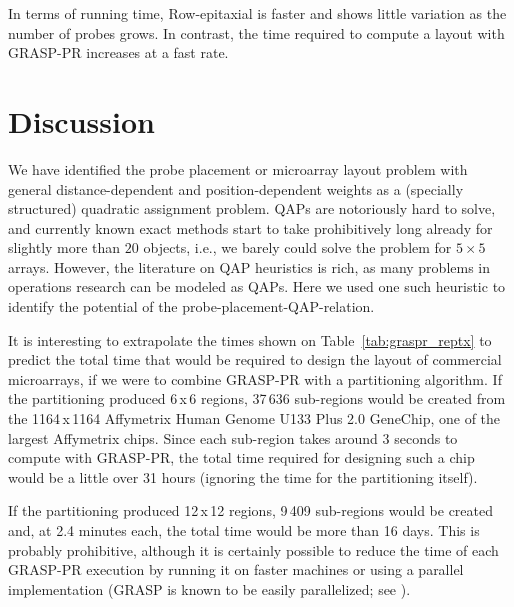 \documentclass[english]{lni}
\newcommand{\ignore}[1]{}
\begin{document}
In terms of running time, Row-epitaxial is faster and shows little variation
as the number of probes grows. In contrast, the time required to compute a
layout with GRASP-PR increases at a fast rate.

\section{Discussion}
\label{sec:discussion}

We have identified the probe placement or microarray layout problem with
general distance-dependent and position-dependent weights as a (specially
structured) quadratic assignment problem. QAPs are notoriously hard to solve,
and currently known exact methods start to take prohibitively long already for
slightly more than $20$ objects, i.e., we barely could solve the problem for
$5\times 5$ arrays. However, the literature on QAP heuristics is rich,
as many problems in operations research can be modeled as QAPs. Here we used
one such heuristic to identify the potential of the
probe-placement-QAP-relation.

It is interesting to extrapolate the times shown on Table~\ref{tab:graspr_reptx}
to predict the total time that would be required to design the layout of
commercial microarrays, if we were to combine GRASP-PR with a partitioning
algorithm. If the partitioning produced 6\,x\,6 regions, 37\,636 sub-regions
would be created from the 1164\,x\,1164 Affymetrix Human Genome U133 Plus 2.0
GeneChip\raisebox{.6ex}{\scriptsize \textregistered}, one of the largest
Affymetrix chips. Since each sub-region takes around 3 seconds to compute with
GRASP-PR, the total time required for designing such a chip would be a little
over 31 hours (ignoring the time for the partitioning itself).

If the partitioning produced 12\,x\,12 regions, 9\,409 sub-regions would be
created and, at 2.4 minutes each, the total time would be more than 16 days.
This is probably prohibitive, although it is certainly possible to reduce the
time of each GRASP-PR execution by running it on faster machines or using a
parallel implementation (GRASP is known to be easily parallelized; see
\cite{LI94}).

\ignore{
Figure~\ref{fig:time_extrapolation} shows similar predictions
based on our results with varying chip dimensions and partitioning sizes.
}
\end{document}
